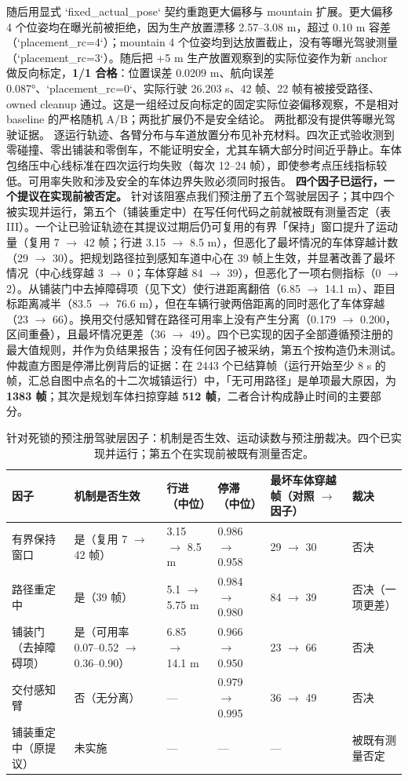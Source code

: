 \documentclass[journal]{IEEEtran}
\begin{document}
随后用显式 `fixed_actual_pose` 契约重跑更大偏移与 mountain 扩展。更大偏移 4 个位姿均在曝光前被拒绝，因为生产放置漂移 2.57--3.08 m，超过 0.10 m 容差（`placement_rc=4`）；mountain 4 个位姿均到达放置截止，没有等曝光驾驶测量（`placement_rc=3`）。随后把 +5 m 生产放置观察到的实际位姿作为新 anchor 做反向标定，\textbf{1/1 合格}：位置误差 0.0209 m、航向误差 0.087°、`placement_rc=0`、实际行驶 26.203 s、42 帧、22 帧有被接受路径、owned cleanup 通过。这是一组经过反向标定的固定实际位姿偏移观察，不是相对 baseline 的严格随机 A/B；两批扩展仍不是安全结论。
两批都没有提供等曝光驾驶证据。
逐运行轨迹、各臂分布与车道放置分布见补充材料。四次正式验收测到零碰撞、零出铺装和零倒车，不能证明安全，尤其车辆大部分时间近乎静止。车体包络压中心线标准在四次运行均失败（每次 12--24 帧），即使参考点压线指标较低。可用率失败和涉及安全的车体边界失败必须同时报告。
\textbf{四个因子已运行，一个提议在实现前被否定。} 针对该阻塞点我们预注册了五个驾驶层因子；其中四个被实现并运行，第五个（铺装重定中）在写任何代码之前就被既有测量否定（表 III）。一个让已验证轨迹在其提议过期后仍可复用的有界「保持」窗口提升了运动量（复用 7 $\rightarrow$ 42 帧；行进 3.15 $\rightarrow$ 8.5 m），但恶化了最坏情况的车体穿越计数（29 $\rightarrow$ 30）。把规划路径拉到感知车道中心在 39 帧上生效，并显著改善了最坏情况（中心线穿越 3 $\rightarrow$ 0；车体穿越 84 $\rightarrow$ 39），但恶化了一项右侧指标（0 $\rightarrow$ 2）。从铺装门中去掉障碍项（见下文）使行进距离翻倍（6.85 $\rightarrow$ 14.1 m）、距目标距离减半（83.5 $\rightarrow$ 76.6 m），但在车辆行驶两倍距离的同时恶化了车体穿越（23 $\rightarrow$ 66）。换用交付感知臂在路径可用率上没有产生分离（0.179 $\rightarrow$ 0.200，区间重叠），且最坏情况更差（36 $\rightarrow$ 49）。四个已实现的因子全部遵循预注册的最大值规则，并作为负结果报告；没有任何因子被采纳，第五个按构造仍未测试。
仲裁直方图是停滞比例背后的证据：在 2443 个已结算帧（运行开始至少 8 s 的帧，汇总自图中点名的十二次城镇运行）中，「无可用路径」是单项最大原因，为 \textbf{1383 帧}；其次是规划车体扫掠穿越 \textbf{512 帧}，二者合计构成静止时间的主要部分。
\begin{table}[!t]
\centering
\caption{针对死锁的预注册驾驶层因子：机制是否生效、运动读数与预注册裁决。四个已实现并运行；第五个在实现前被既有测量否定。}
\begin{tabular}{@{}llllll@{}}
\toprule
因子 & 机制是否生效 & 行进（中位） & 停滞（中位） & 最坏车体穿越帧（对照 $\rightarrow$ 因子） & 裁决 \\
\midrule
有界保持窗口 & 是（复用 7 $\rightarrow$ 42 帧） & 3.15 $\rightarrow$ 8.5 m & 0.986 $\rightarrow$ 0.958 & 29 $\rightarrow$ 30 & 否决 \\
路径重定中 & 是（39 帧） & 5.1 $\rightarrow$ 5.75 m & 0.984 $\rightarrow$ 0.980 & 84 $\rightarrow$ 39 & 否决（一项更差） \\
铺装门（去掉障碍项） & 是（可用率 0.07--0.52 $\rightarrow$ 0.36--0.90） & 6.85 $\rightarrow$ 14.1 m & 0.966 $\rightarrow$ 0.950 & 23 $\rightarrow$ 66 & 否决 \\
交付感知臂 & 否（无分离） & --- & 0.979 $\rightarrow$ 0.995 & 36 $\rightarrow$ 49 & 否决 \\
铺装重定中（原提议） & 未实施 & --- & --- & --- & 被既有测量否定 \\
\bottomrule
\end{tabular}
\end{table}
\end{document}
